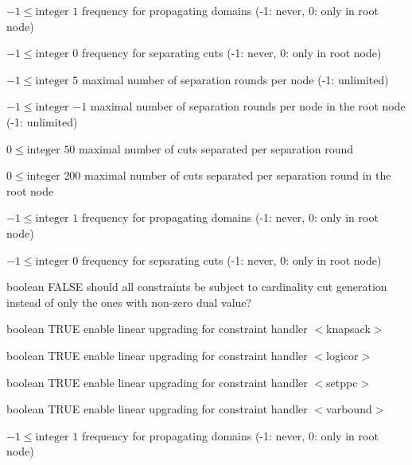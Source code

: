 %
{$-1\leq\textrm{integer}$}%
{$1$}%
{frequency for propagating domains (-1: never, 0: only in root node)}%
{}

%
{$-1\leq\textrm{integer}$}%
{$0$}%
{frequency for separating cuts (-1: never, 0: only in root node)}%
{}

%
{$-1\leq\textrm{integer}$}%
{$5$}%
{maximal number of separation rounds per node (-1: unlimited)}%
{}

%
{$-1\leq\textrm{integer}$}%
{$-1$}%
{maximal number of separation rounds per node in the root node (-1: unlimited)}%
{}

%
{$0\leq\textrm{integer}$}%
{$50$}%
{maximal number of cuts separated per separation round}%
{}

%
{$0\leq\textrm{integer}$}%
{$200$}%
{maximal number of cuts separated per separation round in the root node}%
{}

%
{$-1\leq\textrm{integer}$}%
{$1$}%
{frequency for propagating domains (-1: never, 0: only in root node)}%
{}

%
{$-1\leq\textrm{integer}$}%
{$0$}%
{frequency for separating cuts (-1: never, 0: only in root node)}%
{}

%
{boolean}%
{FALSE}%
{should all constraints be subject to cardinality cut generation instead of only the ones with non-zero dual value?}%
{}

%
{boolean}%
{TRUE}%
{enable linear upgrading for constraint handler $<$knapsack$>$}%
{}

%
{boolean}%
{TRUE}%
{enable linear upgrading for constraint handler $<$logicor$>$}%
{}

%
{boolean}%
{TRUE}%
{enable linear upgrading for constraint handler $<$setppc$>$}%
{}

%
{boolean}%
{TRUE}%
{enable linear upgrading for constraint handler $<$varbound$>$}%
{}

%
{$-1\leq\textrm{integer}$}%
{$1$}%
{frequency for propagating domains (-1: never, 0: only in root node)}%
{}

